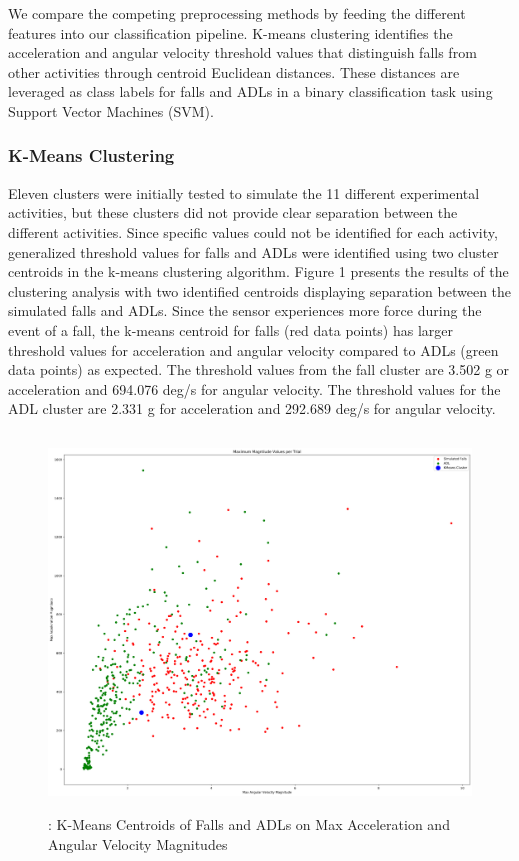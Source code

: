 \documentclass{llncs}
\begin{document}
We compare the competing preprocessing methods by feeding the different features into our classification pipeline. K-means clustering identifies the acceleration and angular velocity threshold values that distinguish falls from other activities through centroid Euclidean distances. These distances are leveraged as class labels for falls and ADLs in a binary classification task using Support Vector Machines (SVM). 

\subsubsection{K-Means Clustering} 

	Eleven clusters were initially tested to simulate the 11 different experimental activities, but these clusters did not provide clear separation between the different activities. Since specific values could not be identified for each activity, generalized threshold values for falls and ADLs were identified using two cluster centroids in the k-means clustering algorithm. Figure 1 presents the results of the clustering analysis with two identified centroids displaying separation between the simulated falls and ADLs. Since the sensor experiences more force during the event of a fall, the k-means centroid for falls (red data points) has larger threshold values for acceleration and angular velocity compared to ADLs (green data points) as expected. The threshold values from the fall cluster are 3.502 g or acceleration and 694.076 deg/s for angular velocity. The threshold values for the ADL cluster are 2.331 g for acceleration and 292.689 deg/s for angular velocity. 

\begin{figure}
	\centering
	\includegraphics[width=12cm, height=10cm]{images/MaxMagnitudeClusters.png} 
	\caption{: K-Means Centroids of Falls and ADLs on Max Acceleration and Angular Velocity Magnitudes}
	\label{Figure 1: K-Means Clusters of Maximum Magnitude Values per Trial}
\end{figure}
\end{document}
